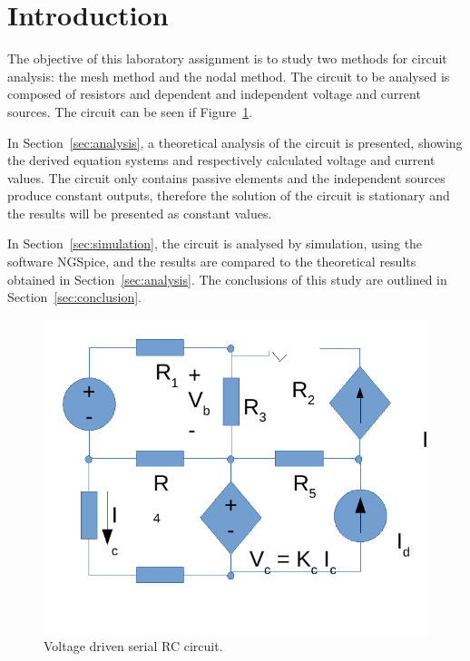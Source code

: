\section{Introduction}
\label{sec:introduction}

\par The objective of this laboratory assignment is to study two methods for circuit analysis: the mesh method and the nodal method. The circuit to be analysed is composed of resistors and dependent and independent voltage and current sources. The circuit can be seen if Figure~\ref{fig:rc}. 

\par In Section~\ref{sec:analysis}, a theoretical analysis of the circuit is presented, showing the derived equation systems and respectively calculated voltage and current values. The circuit only contains passive elements and the independent sources produce constant outputs, therefore the solution of the circuit is stationary and the results will be presented as constant values.
\par In Section~\ref{sec:simulation}, the circuit is analysed by
simulation, using the software NGSpice, and the results are compared to the theoretical results obtained in
Section~\ref{sec:analysis}. The conclusions of this study are outlined in
Section~\ref{sec:conclusion}.

\begin{figure}[h] \centering
\includegraphics[width=0.4\linewidth]{rc.pdf}
\caption{Voltage driven serial RC circuit.}
\label{fig:rc}
\end{figure}
